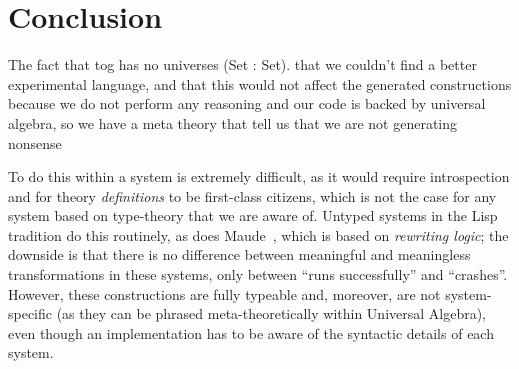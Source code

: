 \chapter{Conclusion}
\label{ch:conclusion}

The fact that tog has no universes (Set : Set). that we couldn't find a better experimental language, and that this would not affect the generated constructions because we do not perform any reasoning and our code is backed by universal algebra, so we have a meta theory that tell us that we are not generating nonsense 

To do this within a system is extremely difficult, as it would require introspection and for theory
\emph{definitions} to be first-class citizens, which is not the case for any
system based on type-theory that we are aware of. Untyped systems
in the Lisp tradition do this routinely, as does Maude~\cite{Maude}, which
is based on \emph{rewriting logic}; the downside is that there is no
difference between meaningful and meaningless transformations in these
systems, only between ``runs successfully'' and ``crashes''. However,
these constructions are fully typeable and, moreover, are not system-specific
(as they can be phrased meta-theoretically within Universal
Algebra), even though an implementation has to be aware of the syntactic
details of each system.